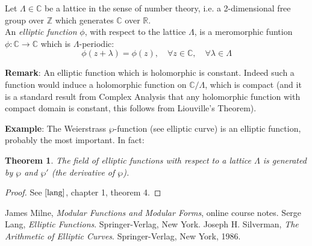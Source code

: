 \documentclass[12pt]{article}
\newtheorem{thm}{Theorem}
\begin{document}
Let $\Lambda \in \mathbb{C}$ be a lattice in the sense of number
theory, i.e. a 2-dimensional free group over ${\mathbb{Z}}$ which
generates $\mathbb{C}$ over $\mathbb{R}$.\\

An {\it elliptic function} $\phi$, with respect to the lattice
$\Lambda$, is a meromorphic funtion $\phi:\mathbb{C} \to
\mathbb{C}$ which is $\Lambda$-periodic:
$$ \phi(z+\lambda)=\phi(z),\quad \forall z\in \mathbb{C},\quad \forall \lambda \in \Lambda$$

{\bf Remark}: An elliptic function which is holomorphic is
constant. Indeed such a function would induce a holomorphic
function on ${\mathbb{C}/\Lambda}$, which is compact (and it is a
standard result from Complex Analysis that any holomorphic
function with compact domain is constant, this follows from
Liouville's Theorem).

{\bf Example}: The Weierstrass $\wp$-function (see elliptic curve)
is an elliptic function, probably the most important. In fact:
\begin{thm} The field of elliptic functions with respect to a lattice
$\Lambda$ is generated by $\wp$ and $\wp'$ (the derivative of
$\wp$).
\end{thm}
\begin{proof}
See $\cite{lang}$, chapter 1, theorem 4.
\end{proof}

\begin{thebibliography}{9}
 James Milne, {\em Modular Functions and Modular Forms}, online course notes. 
 Serge Lang, {\em Elliptic Functions}. Springer-Verlag, New York.
 Joseph H. Silverman, {\em The Arithmetic of Elliptic Curves}. Springer-Verlag, New York, 1986.

\end{thebibliography}
\end{document}
